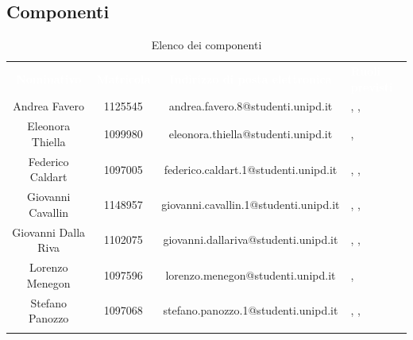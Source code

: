 \subsection{Componenti}
\begin{longtable}{ c  c  c  C{4cm} }
	\textcolor{white}{\textbf{Nominativo}} & \textcolor{white}{\textbf{Matricola}} & \textcolor{white}{\textbf{Indirizzo di posta elettronica}} & \textcolor{white}{\textbf{Ruoli previsti}}\\
	
	Andrea Favero & 1125545 & andrea.favero.8@studenti.unipd.it & \prog, \progr, \ver \\
	
	Eleonora Thiella & 1099980 & eleonora.thiella@studenti.unipd.it & \progr, \ver \\
	
	Federico Caldart & 1097005 & federico.caldart.1@studenti.unipd.it & \RdP, \progr, \ver \\
	
	Giovanni Cavallin & 1148957 & giovanni.cavallin.1@studenti.unipd.it & \RdP, \progr, \ver\\
	
	Giovanni Dalla Riva & 1102075 & giovanni.dallariva@studenti.unipd.it & \RdP, \progr, \ver \\
	
	Lorenzo Menegon & 1097596 & lorenzo.menegon@studenti.unipd.it & \adm, \ver \\
	
	Stefano Panozzo & 1097068 & stefano.panozzo.1@studenti.unipd.it & \prog, \progr, \ver \\
	\caption{Elenco dei componenti}\\
\end{longtable}